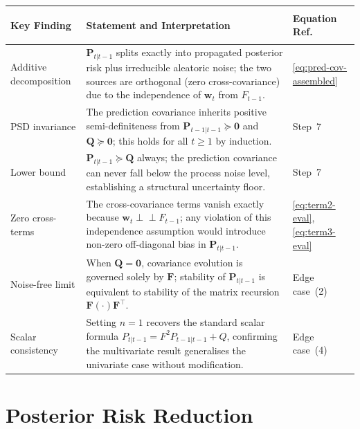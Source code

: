 \documentclass[12pt,openany]{book}
\numberwithin{equation}{chapter}
\theoremstyle{plain}
\theoremstyle{definition}
\theoremstyle{remark}
\renewcommand{\arraystretch}{1.2}
\def\mathcal#1{#1}%
\begin{document}
\begin{center}
\small
\renewcommand{\arraystretch}{1.35}
\begin{tabularx}{\linewidth}{|>{\bfseries\raggedright\arraybackslash}p{3.2cm}
                              |>{\raggedright\arraybackslash}X
                              |>{\centering\arraybackslash}p{2.4cm}|}
\hline
\rowcolor{gray!18}
\textbf{Key Finding} & \textbf{Statement and Interpretation}
  & \textbf{Equation Ref.} \\
\hline
Additive decomposition
  & $\mathbf{P}_{t|t-1}$ splits exactly into propagated
    posterior risk plus irreducible aleatoric noise; the two
    sources are orthogonal (zero cross-covariance) due to the
    independence of $\mathbf{w}_t$ from $\mathcal{F}_{t-1}$.
  & \eqref{eq:pred-cov-assembled} \\
\hline
PSD invariance
  & The prediction covariance inherits positive
    semi-definiteness from $\mathbf{P}_{t-1|t-1} \succeq
    \mathbf{0}$ and $\mathbf{Q} \succeq \mathbf{0}$;
    this holds for all $t \geq 1$ by induction.
  & Step~7 \\
\hline
Lower bound
  & $\mathbf{P}_{t|t-1} \succeq \mathbf{Q}$ always; the
    prediction covariance can never fall below the process
    noise level, establishing a structural uncertainty floor.
  & Step~7 \\
\hline
Zero cross-terms
  & The cross-covariance terms vanish exactly because
    $\mathbf{w}_t \perp\!\!\!\perp \mathcal{F}_{t-1}$;
    any violation of this independence assumption would
    introduce non-zero off-diagonal bias in $\mathbf{P}_{t|t-1}$.
  & \eqref{eq:term2-eval}, \eqref{eq:term3-eval} \\
\hline
Noise-free limit
  & When $\mathbf{Q} = \mathbf{0}$, covariance evolution is
    governed solely by $\mathbf{F}$; stability of
    $\mathbf{P}_{t|t-1}$ is equivalent to stability of the
    matrix recursion $\mathbf{F}(\cdot)\mathbf{F}^\top$.
  & Edge case~(2) \\
\hline
Scalar consistency
  & Setting $n = 1$ recovers the standard scalar formula
    $P_{t|t-1} = F^2 P_{t-1|t-1} + Q$, confirming the
    multivariate result generalises the univariate case
    without modification.
  & Edge case~(4) \\
\hline
\end{tabularx}
\end{center}

\section{Posterior Risk Reduction}
\end{document}
